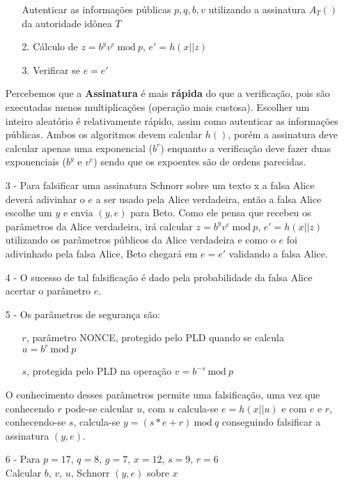 \documentclass[12pt]{article}
\newcommand{\modd}{\ \text{mod}\ }
\begin{document}
\begin{itemize}
\begin{itemize}
							Autenticar as informações públicas $p, q, b, v$ utilizando
							a assinatura $A_T()$ da autoridade idônea $T$
						\item[2.]
							Cálculo de $z = b^yv^e \modd p$, $e' = h(x||z)$
						\item[3.]
							Verificar se $e = e'$	
					\end{itemize}		
				Percebemos que a \textbf{Assinatura} é mais \textbf{rápida} do que a
				verificação, pois são executadas menos multiplicações (operação mais
				custosa).  Escolher um inteiro aleatório é relativamente rápido, assim
				como autenticar as informações públicas. Ambos os algoritmos devem
				calcular $h()$, porém a assinatura deve calcular apenas uma 
				exponencial ($b^r$) enquanto a verificação deve fazer duas
				exponenciais ($b^y$ e $v^e$) sendo que os expoentes são de
				ordens parecidas.
			\item[3 -]
				Para falsificar uma assinatura Schnorr sobre um texto x a falsa
				Alice deverá adivinhar o $e$ a ser usado pela Alice verdadeira,
				então a falsa Alice escolhe um $y$ e envia $(y, e)$ para Beto.
				Como ele pensa que recebeu os parâmetros da Alice verdadeira,
				irá calcular $z = b^yv^e \modd p$, $e' = h(x||z)$ utilizando
				os parâmetros públicos da Alice verdadeira e como o $e$ foi
				adivinhado pela falsa Alice, Beto chegará em $e = e'$ validando
				a falsa Alice.
			\item[4 -]
				O sucesso de tal falsificação é dado pela probabilidade da falsa
				Alice acertar o parâmetro $e$.
			\item[5 -]
				Os parâmetros de segurança são:
				\begin{itemize}
					\item[]
						$r$, parâmetro NONCE, protegido pelo PLD quando se
						calcula $u = b^r \modd p$\\
					\item[]
						$s$, protegida pelo PLD na operação $v = b^{-s} \modd p$	
				\end{itemize}	
				O conhecimento desses parâmetros permite uma falsificação, uma
				vez que conhecendo $r$ pode-se calcular $u$, com $u$ calcula-se
				$e = h(x||u)$	 e com $e$ e $r$, conhecendo-se $s$, calcula-se
				$y = (s*e + r) \modd q$	conseguindo falsificar a assinatura $(y, e)$.	
			\item[6 -]
				Para $p = 17$, $q = 8$, $g = 7$, $x = 12$, $s = 9$, $r = 6$\\
				Calcular	 $b$, $v$, $u$, Schnorr $(y, e)$ sobre $x$
				\begin{itemize}

\end{itemize}
\end{itemize}
\end{document}
